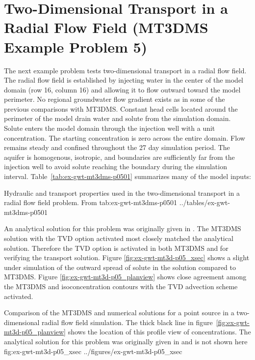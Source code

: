 \section{Two-Dimensional Transport in a Radial Flow Field (MT3DMS Example Problem 5)}

The next example problem tests two-dimensional transport in a radial flow field.  The radial flow field is established by injecting water in the center of the model domain (row 16, column 16) and allowing it to flow outward toward the model perimeter. No regional groundwater flow gradient exists as in some of the previous comparisons with MT3DMS. Constant head cells located around the perimeter of the model drain water and solute from the simulation domain. Solute enters the model domain through the injection well with a unit concentration.  The starting concentration is zero across the entire domain. Flow remains steady and confined throughout the 27 day simulation period. The aquifer is homogenous, isotropic, and boundaries are sufficiently far from the injection well to avoid solute reaching the boundary during the simulation interval. Table~\ref{tab:ex-gwt-mt3dms-p0501} summarizes many of the model inputs:

\begin{StandardTable}
	{Hydraulic and transport properties used in the two-dimensional transport in a radial flow field problem.  From \cite{zheng1999mt3dms}}
	{tab:ex-gwt-mt3dms-p0501}
	{../tables/ex-gwt-mt3dms-p0501}
\end{StandardTable}

An analytical solution for this problem was originally given in \cite{moench1981}. The MT3DMS solution with the TVD option activated most closely matched the analytical solution.  Therefore the TVD option is activated in both MT3DMS and \mf for verifying the transport solution. Figure \ref{fig:ex-gwt-mt3d-p05_xsec} shows a slight under simulation of the outward spread of solute in the \mf solution compared to MT3DMS. Figure \ref{fig:ex-gwt-mt3d-p05_planview} shows close agreement among the MT3DMS and \mf isoconcentration contours with the TVD advection scheme activated. 

\begin{StandardFigure}
	{Comparison of the MT3DMS and \mf numerical solutions for a point source in a two-dimensional radial flow field simulation.  The thick black line in figure~\ref{fig:ex-gwt-mt3d-p05_planview} shows the location of this profile view of concentrations.  The analytical solution for this problem was originally given in \citep{moench1981} and is not shown here} 
	{fig:ex-gwt-mt3d-p05_xsec}
	{../figures/ex-gwt-mt3d-p05_xsec}
\end{StandardFigure}

